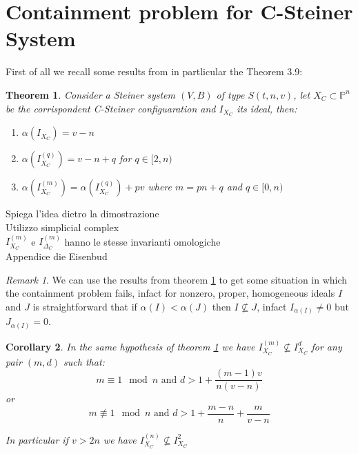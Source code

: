 \documentclass[]{book}
\theoremstyle{plain}
\newtheorem{teo}{Theorem}[section]
\newtheorem{cor}[teo]{Corollary}
\theoremstyle{remark}
\newtheorem{rem}{Remark}
\theoremstyle{definition}
\newcommand{\PP}{\mathbb{P}}
\begin{document}
 \section{Containment problem for C-Steiner System}
 
 First of all we recall some results from \cite{Bal20Steiner} in partlicular the Theorem 3.9:
 
 \begin{teo} \label{teo:alphaXC}
Consider a Steiner system $ (V,B) $ of type $ S(t,n,v) $, let $ X_C \subset \PP^n$ be the corrispondent C-Steiner configuaration and $ I_{X_C} $ its ideal, then:
\begin{enumerate}
\item $ \alpha(I_{X_C}) = v- n $
\item $ \alpha(I_{X_C}^{(q)}) = v- n +q  $ for $ q \in [2,n) $
\item $ \alpha(I_{X_C}^{(m)}) = \alpha(I_{X_C}^{(q)}) + pv $ where $ m=pn + q $ and $ q \in [0,n) $
\end{enumerate}
 \end{teo}
 
 \begin{tcolorbox}
 Spiega l'idea dietro la dimostrazione\\
 Utilizzo simplicial complex\\
 $ I_{X_C}^{(m)} $ e $ I_{\Delta_C}^{(m)} $ hanno le stesse invarianti omologiche\\
 Appendice die Eisenbud
  \end{tcolorbox}
  
\begin{rem}\label{rem:alphaXC}
We can use the results from theorem \ref{teo:alphaXC} to get some situation in which the containment problem fails, infact for nonzero, proper, homogeneous ideals $ I $ and $ J $ is straightforward that if $ \alpha(I) < \alpha(J) $ then $ I \not\subseteq J $, infact $ I_{ \alpha(I) } \neq 0$ but $ J_{ \alpha(I) } = 0 $. 
\end{rem}

\begin{cor}\label{cor:alphaXC}
In the same hypothesis of theorem \ref{teo:alphaXC} we have $ I_{X_C}^{(m)} \not \subseteq I_{X_C}^d $ for any pair $ (m,d) $ such that:
\begin{equation}\label{eq:cor:alphaXC:1}
	m \equiv 1 \mod n \text{ and } d > 1 + \frac{ (m-1)v }{ n(v-n)}
\end{equation}
or 
\begin{equation}\label{eq:cor:alphaXC:2}
	m \not \equiv 1 \mod n \text{ and } d > 1  + \frac{ m - n }{ n } + \frac{ m }{ v - n }
\end{equation}

 In particular if $ v > 2n $ we have $ I_{X_C}^{(n)} \not \subseteq I_{X_C}^2  $
 \end{cor}
  
\end{document}

